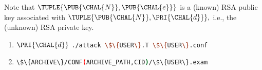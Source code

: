 
%
Note that
$
\TUPLE{ \PUB{\CHAL{N}}, \PUB{\CHAL{e}} }
$
is
a     (known) RSA public  key 
associated with 
$
\TUPLE{ \PUB{\CHAL{N}}, \PRI{\CHAL{d}} } ,
$
i.e.,
the (unknown) RSA private key.



\begin{enumerate}
\item \DESCTASKIMPL
      {$\PRI{\CHAL{d}}$}
      {\mbox{\lstinline[language={bash}]|./attack \$\{USER\}.T \$\{USER\}.conf|}}
\item \DESCTASKEXAM
      {\mbox{\lstinline[language={bash}]|\$\{ARCHIVE\}/CONF(ARCHIVE_PATH,CID)/\$\{USER\}.exam|}}
\end{enumerate}

